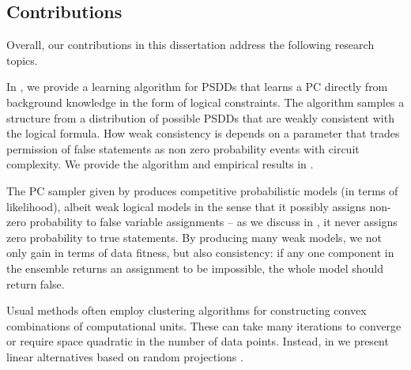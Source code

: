 \subsection{Contributions}

Overall, our contributions in this dissertation address the following research topics.


In \citet{geh21a}, we provide a learning algorithm for PSDDs that learns a PC directly from
background knowledge in the form of logical constraints. The algorithm samples a structure from a
distribution of possible PSDDs that are weakly consistent with the logical formula. How weak
consistency is depends on a parameter that trades permission of false statements as non zero
probability events with circuit complexity. We provide the algorithm and empirical results in
.


The PC sampler given by \citet{geh21a} produces competitive probabilistic models (in terms of
likelihood), albeit weak logical models in the sense that it possibly assigns non-zero probability
to false variable assignments -- as we discuss in , it never assigns zero
probability to true statements. By producing many weak models, we not only gain in terms of data
fitness, but also consistency: if any one component in the ensemble returns an assignment to be
impossible, the whole model should return false.


Usual methods often employ clustering algorithms for constructing convex combinations of
computational units. These can take many iterations to converge or require space quadratic in the
number of data points. Instead, in  we present linear alternatives based on random
projections \citep{dasgupta08a,dasgupta08b}.
